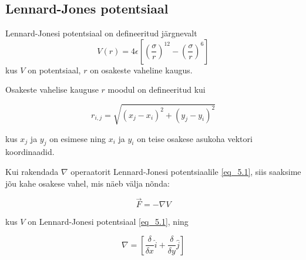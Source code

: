 \begin{flushleft}

\section{Lennard-Jones potentsiaal}
 
Lennard-Jonesi potentsiaal on defineeritud järgnevalt
\begin{equation} \label{eq_5.1}
V(r)=4 \epsilon \left[ \left( \dfrac{\sigma}{r} \right)^{12}- \left( \dfrac{\sigma}{r} \right)^{6} \right]
\end{equation}
kus $V$ on potentsiaal, $r$ on osakeste vaheline kaugus.

Osakeste vahelise kauguse $r$ moodul on defineeritud kui

\begin{equation} \label{eq_5.2}
r_{i,j}=\sqrt{(x_{j}-x_{i})^{2}+(y_{j}-y_{i})^{2}}
\end{equation}

kus $x_{j}$ ja $y_{j}$ on esimese ning $x_{i}$ ja $y_{i}$ on teise osakese asukoha vektori koordinaadid.

Kui rakendada $ \nabla $ operaatorit Lennard-Jonesi potentsiaalile \ref{eq_5.1}, siis saaksime jõu kahe osakese vahel, mis näeb välja nõnda:

\begin{equation} \label{eq_5.3}
\vec{F}=-\nabla V
\end{equation}

kus $V$ on Lennard-Jonesi potentsiaal \ref{eq_5.1}, ning

\begin{equation} \label{eq_5.4}
\nabla =\left[ \dfrac{ \delta }{\delta x} \hat{i}+\dfrac{\delta}{\delta y} \hat{j} \right]
\end{equation}



\begin{center}
\end{center}


\end{flushleft}
